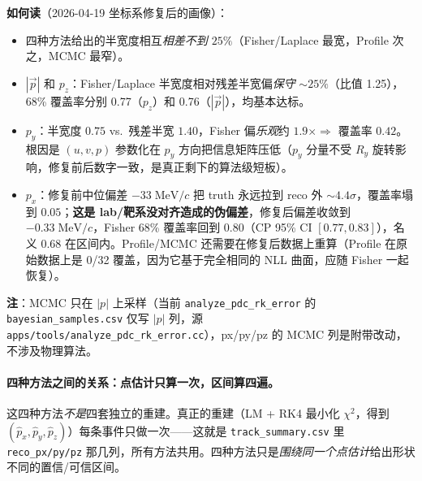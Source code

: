\documentclass[a4paper, 11pt]{article}
\begin{document}
\textbf{如何读}（2026-04-19 坐标系修复后的画像）：
\begin{itemize}[nosep]
  \item 四种方法给出的半宽度相互\emph{相差不到 $25\%$}（Fisher/Laplace 最宽，Profile 次之，MCMC 最窄）。
  \item $|\vec p|$ 和 $p_z$：Fisher/Laplace 半宽度相对残差半宽偏\emph{保守} $\sim 25\%$（比值 1.25），68\% 覆盖率分别 0.77（$p_z$）和 0.76（$|\vec p|$），均基本达标。
  \item $p_y$：半宽度 $0.75$ vs.\ 残差半宽 $1.40$，Fisher 偏\emph{乐观}约 $1.9\times \Rightarrow$ 覆盖率 $0.42$。根因是 $(u,v,p)$ 参数化在 $p_y$ 方向把信息矩阵压低（$p_y$ 分量不受 $R_y$ 旋转影响，修复前后数字一致，是真正剩下的算法级短板）。
  \item $p_x$：修复前中位偏差 $-33\;\mathrm{MeV}/c$ 把 truth 永远拉到 reco 外 $\sim\!4.4\sigma$，覆盖率塌到 $0.05$；\textbf{这是 lab/靶系没对齐造成的伪偏差}，修复后偏差收敛到 $-0.33\;\mathrm{MeV}/c$，Fisher 68\% 覆盖率回到 $0.80$（CP 95\% CI $[0.77, 0.83]$），名义 0.68 在区间内。Profile/MCMC 还需要在修复后数据上重算（Profile 在原始数据上是 0/32 覆盖，因为它基于完全相同的 NLL 曲面，应随 Fisher 一起恢复）。
\end{itemize}

\textbf{注}：MCMC 只在 $|p|$ 上采样（当前 \texttt{analyze\_pdc\_rk\_error} 的 \texttt{bayesian\_samples.csv} 仅写 $|p|$ 列，源 \texttt{apps/tools/analyze\_pdc\_rk\_error.cc}），px/py/pz 的 MCMC 列是附带改动，不涉及物理算法。

\paragraph{四种方法之间的关系：点估计只算一次，区间算四遍。}

这四种方法\emph{不是}四套独立的重建。真正的重建（LM + RK4 最小化 $\chi^2$，得到 $(\hat{p}_x,\hat{p}_y,\hat{p}_z)$）每条事件只做一次——这就是 \texttt{track\_summary.csv} 里 \texttt{reco\_px/py/pz} 那几列，所有方法共用。四种方法只是\emph{围绕同一个点估计}给出形状不同的置信/可信区间。

\begin{center}\small
{}
\end{center}
\end{document}
